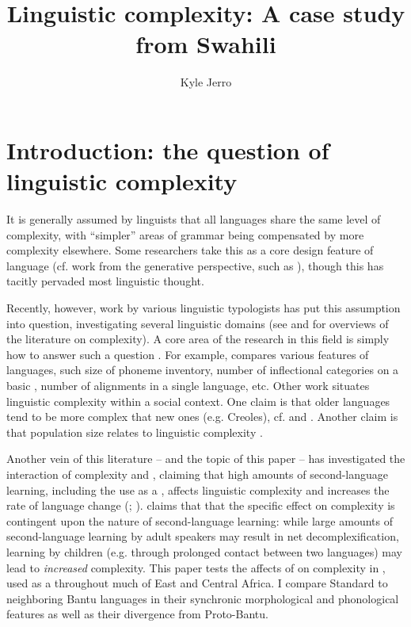 \documentclass[output=paper,
modfonts
]{langscibook}
\title{Linguistic complexity: A case study from Swahili }
\author{Kyle Jerro\affiliation{University of Essex}}
\begin{document}
\maketitle

 
 
 



\section{Introduction: the question of linguistic complexity}\label{sec:1:jerro}

It is generally assumed by linguists that all languages share the same level of complexity, with ``simpler'' areas of grammar being compensated by more complexity elsewhere. Some researchers take this as a core design feature of language (cf. work from the generative perspective, such as \citealt{Pinker1990,Pinker1994,Baker2003differences}), though this has tacitly pervaded most linguistic thought. 

Recently, however, work by various linguistic typologists has put this assumption into question, investigating several linguistic domains (see \citealt{Miestamo2008,Sampson2009} and \citealt{Givón2009} for overviews of the literature on complexity).  A core area of the research in this field is simply how to answer such a question \citep{Nichols2009, Sampson2009, MiestamoEd2008}. For example, \citet{Nichols2009} compares various features of languages, such size of phoneme inventory, number of inflectional categories on a basic , number of alignments in a single language, etc. Other work situates linguistic complexity within a social context. One claim is that older languages tend to be more complex that new ones (e.g. Creoles), cf. \citet{McWhorter2008} and \citet{Trudgill2009}. Another claim is that population size relates to linguistic complexity \citep{Trudgill2004, Hay2007, Nichols2009}.

Another vein of this literature -- and the topic of this paper -- has investigated the interaction of complexity and , claiming that high amounts of second-language learning, including the use as a , affects linguistic complexity and increases the rate of language change (\citealt{Kusters2003phd,Kusters2003fate}; \citealt{Trudgill2009,McWhorter2008,McWhorter2011,Trudgill2011}). 
\citet{Trudgill2011} claims that that the specific effect on complexity is contingent upon the nature of second-language learning: while large amounts of second-language learning by adult speakers may result in net decomplexification, learning by children (e.g. through prolonged contact between two languages) may lead to \emph{increased} complexity. This paper tests the affects of  on complexity in , used as a  throughout much of East and Central Africa. I compare Standard  to neighboring Bantu languages in their synchronic morphological and phonological features as well as their divergence from Proto-Bantu. 
\end{document}
